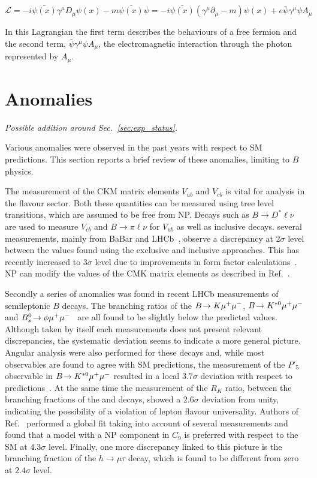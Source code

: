 \begin{equation}
\mathcal{L} = -i \bar{\psi(x)} \gamma^{\mu} D_\mu \psi(x)  - m\bar{\psi(x)} \psi = -i \bar{\psi(x)} (\gamma^{\mu} \partial_\mu  - m)\psi(x) + e\bar{\psi}  \gamma^{\mu} \psi A_\mu
\end{equation}

In this Lagrangian the first term describes the behaviours of a free fermion and the second term,
$\bar{\psi}  \gamma^{\mu} \psi A_\mu$, the electromagnetic interaction through the photon represented by $A_\mu$.


\section{Anomalies}

{\em Possible addition around Sec.~\ref{sec:exp_status}.}

Various anomalies were observed in the past years with respect to SM predictions.
This section reports a brief review of these anomalies, limiting to $B$ physics.

The measurement of the CKM matrix elements $V_{ub}$ and $V_{cb}$
is vital for analysis in the flavour sector. Both these quantities can be measured
using tree level transitions, which are assumed to be free from NP.
Decays such as $B\to D^{*}\ell\nu$ are used to measure $V_{cb}$
and $B\to\pi\ell\nu$ for $V_{ub}$ as well as inclusive decays.
several measurements, mainly from BaBar and LHCb~\cite{Aaij:2015bfa,}, observe a discrepancy
at $2\sigma$ level between the values found using the exclusive and inclusive approaches.
This has recently increased to $3\sigma$ level due to improvements in form factor calculations~\cite{Crivellin:2014zpa}.
NP can modify the values of the CMK matrix elements as described in Ref.~\cite{}.

Secondly a series of anomalies was found in recent LHCb measurements of semileptonic $B$ decays.
The branching ratios of the $B\!\rightarrow K\mu^+\mu^-$, $B\!\rightarrow K^{*0}\mu^+\mu^-$
and $B^0_s\!\rightarrow \phi\mu^+\mu^-$~\cite{LHCB-PAPER-2014-006,LHCB-PAPER-2013-017,LHCB-PAPER-2013-019}
are all found to be slightly below the predicted values. Although taken by itself each measurements
does not present relevant discrepancies, the systematic deviation seems to indicate a more general picture.
Angular analysis were also performed for these decays and, while most observables are found
to agree with SM predictions, the measurement of the $P'_5$ observable in $B\!\rightarrow K^{*0}\mu^+\mu^-$
resulted in a local $3.7\sigma$ deviation with respect to predictions~\cite{}.
At the same time the measurement of the $R_K$ ratio, between the branching fractions
of the \Bz\to\Kstarz\mumu and \Bz\to\Kstarz\ee decays, showed a $2.6\sigma$ deviation from unity,
indicating the possibility of a violation of lepton flavour universality.
Authors of Ref.~\cite{Altmannshofer:2014rta} performed a global fit taking into account of several measurements
and found that a model with a NP component in $C_9$ is preferred with respect to the SM at $4.3\sigma$ level.
Finally, one more discrepancy linked to this picture is the branching fraction of the $h\to\mu\tau$ decay,
which is found to be different from zero at $2.4\sigma$ level.


 








